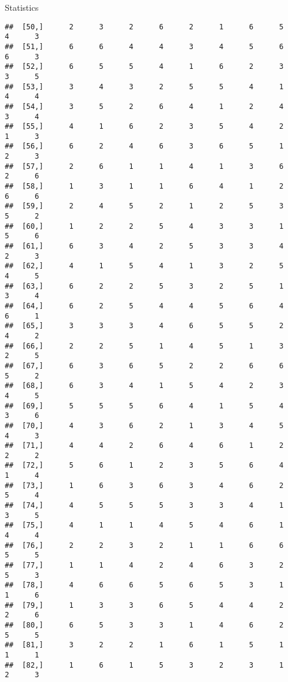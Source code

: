 \documentclass[
  ignorenonframetext,
]{beamer}
\begin{document}
\begin{frame}[fragile]{Statistics}
\begin{verbatim}
##  [50,]      2      3      2      6      2      1      6      5      4      3
##  [51,]      6      6      4      4      3      4      5      6      6      3
##  [52,]      6      5      5      4      1      6      2      3      3      5
##  [53,]      3      4      3      2      5      5      4      1      4      4
##  [54,]      3      5      2      6      4      1      2      4      3      4
##  [55,]      4      1      6      2      3      5      4      2      1      3
##  [56,]      6      2      4      6      3      6      5      1      2      3
##  [57,]      2      6      1      1      4      1      3      6      2      6
##  [58,]      1      3      1      1      6      4      1      2      6      6
##  [59,]      2      4      5      2      1      2      5      3      5      2
##  [60,]      1      2      2      5      4      3      3      1      5      6
##  [61,]      6      3      4      2      5      3      3      4      2      3
##  [62,]      4      1      5      4      1      3      2      5      4      5
##  [63,]      6      2      2      5      3      2      5      1      3      4
##  [64,]      6      2      5      4      4      5      6      4      6      1
##  [65,]      3      3      3      4      6      5      5      2      4      2
##  [66,]      2      2      5      1      4      5      1      3      2      5
##  [67,]      6      3      6      5      2      2      6      6      5      2
##  [68,]      6      3      4      1      5      4      2      3      4      5
##  [69,]      5      5      5      6      4      1      5      4      3      6
##  [70,]      4      3      6      2      1      3      4      5      4      3
##  [71,]      4      4      2      6      4      6      1      2      2      2
##  [72,]      5      6      1      2      3      5      6      4      1      4
##  [73,]      1      6      3      6      3      4      6      2      5      4
##  [74,]      4      5      5      5      3      3      4      1      3      5
##  [75,]      4      1      1      4      5      4      6      1      4      4
##  [76,]      2      2      3      2      1      1      6      6      5      5
##  [77,]      1      1      4      2      4      6      3      2      5      3
##  [78,]      4      6      6      5      6      5      3      1      1      6
##  [79,]      1      3      3      6      5      4      4      2      2      6
##  [80,]      6      5      3      3      1      4      6      2      5      5
##  [81,]      3      2      2      1      6      1      5      1      1      1
##  [82,]      1      6      1      5      3      2      3      1      2      3

\end{verbatim}
\end{frame}
\end{document}
